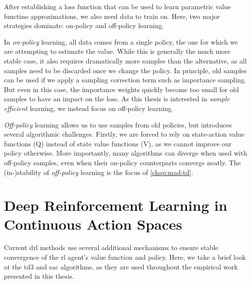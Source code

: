 After establishing a loss function that can be used to learn parametric value functino approximations, we also need data to train on.
Here, two major strategies dominate: on-policy and off-policy learning.

In \emph{on-policy} learning, all data comes from a single policy, the one for which we are attempting to estimate the value.
While this is generally the much more stable case, it also requires dramatically more samples than the alternative, as all samples need to be discarded once we change the policy.
In principle, old samples can be used if we apply a sampling correction term such as importance sampling.
But even in this case, the importance weights quickly become too small for old samples to have an impact on the loss.
As this thesis is interested in \emph{sample efficient} learning, we instead focus on off-policy learning.

\emph{Off-policy} learning allows us to use samples from old policies, but introduces several algorithmic challenges.
Firstly, we are forced to rely on state-action value functions (Q) instead of state value functions (V), as we cannot improve our policy otherwise.
More importantly, many algorithms can diverge when used with off-policy samples, even when their on-policy counterparts converge neatly.
The (in-)stability of \emph{off-policy} learning is the focus of \autoref{chap:mad-td}.

\section{Deep Reinforcement Learning in Continuous Action Spaces}

Current \ac{drl} methods use several additional mechanisms to ensure stable convergence of the \ac{rl} agent's value function and policy.
Here, we take a brief look at the \ac{td3} and \ac{sac} algorithms, as they are used throughout the empirical work presented in this thesis.

